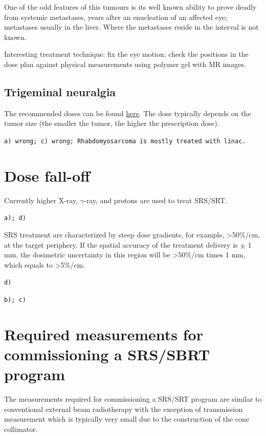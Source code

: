 \documentclass[]{book}
\theoremstyle{definition}
\theoremstyle{definition}
\theoremstyle{definition}
\theoremstyle{remark}
\begin{document}
One of the odd features of this tumours is its well known ability to
prove deadly from systemic metastases, years after an enucleation of an
affected eye; metastases usually in the liver. Where the metastases
reside in the interval is not known.

Interesting treatment technique: fix the eye motion; check the positions
in the dose plan against physical measurements using polymer gel with MR
images.

\subsection{Trigeminal neuralgia}\label{trigeminal-neuralgia}

The recommended doses can be found
\href{http://www.aboutcancer.com/gk_doses.htm}{here}. The dose typically
depends on the tumor size (the smaller the tumor, the higher the
prescription dose).

\texttt{a)\ wrong;\ c)\ wrong;\ Rhabdomyosarcoma\ is\ mostly\ treated\ with\ linac.}

\section{Dose fall-off}\label{dose-fall-off}

Currently higher X-ray, \(\gamma\)-ray, and protons are used to treat
SRS/SRT.

\texttt{a);\ d)}

SRS treatment are characterized by steep dose gradients, for example,
\textgreater{}50\%/cm, at the target periphery. If the spatial accuracy
of the treatment delivery is \(\pm\) 1 mm, the dosimetric uncertainty in
this region will be \textgreater{}50\%/cm times 1 mm, which equals to
\textgreater{}5\%/cm.

\texttt{d)}

\texttt{b);\ c)}

\section{Required measurements for commissioning a SRS/SBRT
program}\label{required-measurements-for-commissioning-a-srssbrt-program}

The measurements required for commissioning a SRS/SRT program are
similar to conventional external beam radiotherapy with the exception of
transmission measurement which is typically very small due to the
construction of the cone collimator.
\end{document}
